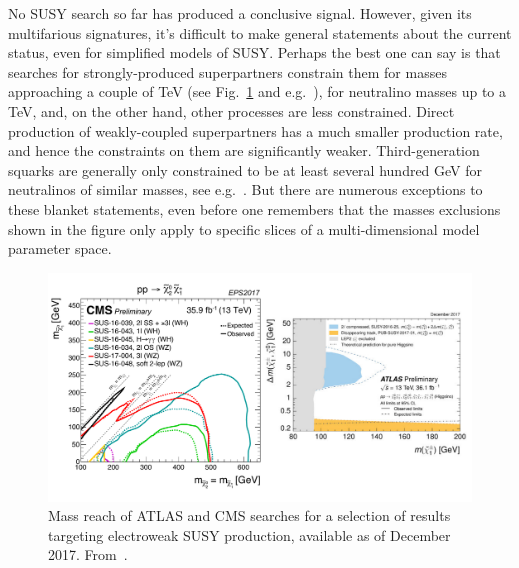 No SUSY search so far has produced a conclusive signal. However, given its multifarious signatures, it's difficult to make general statements about the current status, even for simplified models of SUSY. Perhaps the best one can say is that searches for strongly-produced superpartners constrain them for masses approaching a couple of TeV (see Fig.~\ref{fig:SUSYSummary_ew} and e.g.~\cite{Aaboud:2017bac,Sirunyan:2017yse}), for neutralino masses up to a TeV, and, on the other hand, other processes are less constrained.
Direct production of weakly-coupled superpartners has a much smaller production rate, and hence the constraints on them are significantly weaker.
Third-generation squarks are generally only constrained to be at least several hundred GeV for neutralinos of similar masses, see e.g.~\cite{Sirunyan:2017wif,Aaboud:2016wna}.
But there are numerous exceptions to these blanket statements, even before one remembers that the masses exclusions shown in the figure only apply to specific slices of a multi-dimensional model parameter space.

\begin{figure}[!htpb]
\includegraphics[width=\textwidth]{figures/SUSY_electroweak.pdf}
\caption{Mass reach of ATLAS and CMS searches for a selection of results targeting electroweak SUSY production, available as of December 2017. From~\cite{ATLASSUSYSummary,CMSSUSYSummary}.\label{fig:SUSYSummary_ew}}
\end{figure}

